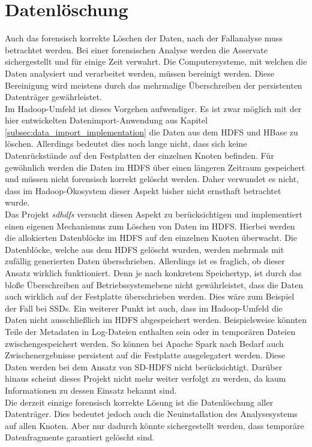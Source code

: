 \section{Datenlöschung}
Auch das forensisch korrekte Löschen der Daten, nach der Fallanalyse muss betrachtet werden. Bei einer forensischen Analyse werden die Asservate sichergestellt und für einige Zeit verwahrt. Die Computersysteme, mit welchen die Daten analysiert und verarbeitet werden, müssen bereinigt werden. Diese Bereinigung wird meistens durch das mehrmalige Überschreiben der persistenten Datenträger gewährleistet.\\ Im Hadoop-Umfeld ist dieses Vorgehen aufwendiger. Es ist zwar möglich mit der hier entwickelten Datenimport-Anwendung aus Kapitel \ref{subsec:data_import_implementation} die Daten aus dem HDFS und HBase zu löschen. Allerdings bedeutet dies noch lange nicht, dass sich keine Datenrückstände auf den Festplatten der einzelnen Knoten befinden.
Für gewöhnlich werden die Daten im HDFS über einen längeren Zeitraum gespeichert und müssen nicht forensisch korrekt gelöscht werden. Daher verwundet es nicht, dass im Hadoop-Ökosystem dieser Aspekt bisher nicht ernsthaft betrachtet wurde.\\
Das Projekt \textit{\gls{sdhdfs}} versucht diesen Aspekt zu berücksichtigen und implementiert einen eigenen Mechanismus zum Löschen von Daten im HDFS.\cite{sd_hdfs} Hierbei werden die allokierten Datenblöcke im HDFS auf den einzelnen Knoten überwacht. Die Datenblöcke, welche aus dem HDFS gelöscht wurden, werden mehrmals mit zufällig generierten Daten überschrieben. Allerdings ist es fraglich, ob dieser Ansatz wirklich funktioniert. Denn je nach konkretem Speichertyp, ist durch das bloße Überschreiben auf Betriebssystemebene nicht gewährleistet, dass die Daten auch wirklich auf der Festplatte überschrieben werden. Dies wäre zum Beispiel der Fall bei SSDs. Ein weiterer Punkt ist auch, dass im Hadoop-Umfeld die Daten nicht ausschließlich im HDFS abgespeichert werden. Beispielsweise könnten Teile der Metadaten in Log-Dateien enthalten sein oder in temporären Dateien zwischengespeichert werden. So können bei Apache Spark nach Bedarf auch Zwischenergebnisse persistent auf die Festplatte ausgelegatert werden.\cite{spark_rdd} Diese Daten werden bei dem Ansatz von SD-HDFS nicht berücksichtigt. Darüber hinaus scheint dieses Projekt nicht mehr weiter verfolgt zu werden, da kaum Informationen zu dessen Einsatz bekannt sind.\\

\noindent
Die  derzeit einzige forensisch korrekte Lösung ist die Datenlöschung aller Datenträger. Dies bedeutet jedoch auch die Neuinstallation des Analysesystems auf allen Knoten. Aber nur dadurch könnte sichergestellt werden, dass temporäre Datenfragmente garantiert gelöscht sind.  